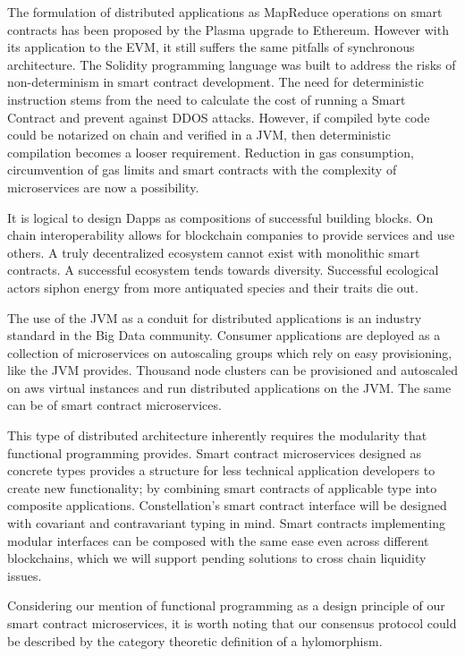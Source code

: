 \documentclass{article}
\begin{document}
The formulation of distributed applications as MapReduce operations on smart contracts has been proposed by the Plasma upgrade to Ethereum. However with its application to the EVM, it still suffers the same pitfalls of synchronous architecture. The Solidity programming language was built to address the risks of non-determinism in smart contract development. The need for deterministic instruction stems from the need to calculate the cost of running a Smart Contract and prevent against DDOS attacks. However, if compiled byte code could be notarized on chain and verified in a JVM, then deterministic compilation becomes a looser requirement. Reduction in gas consumption, circumvention of gas limits and smart contracts with the complexity of microservices are now a possibility.

It is logical to design Dapps as compositions of successful building blocks. On chain interoperability allows for blockchain companies to provide services and use others. A truly decentralized ecosystem cannot exist with monolithic smart contracts. A successful ecosystem tends towards diversity. Successful ecological actors siphon energy from more antiquated species and their traits die out. 

The use of the JVM as a conduit for distributed applications is an industry standard in the Big Data community. Consumer applications are deployed as a collection of microservices on autoscaling groups which rely on easy provisioning, like the JVM provides. Thousand node clusters can be provisioned and autoscaled on aws virtual instances and run distributed applications on the JVM. The same can be of smart contract microservices. 

This type of distributed architecture inherently requires the modularity that functional programming provides. Smart contract microservices designed as concrete types provides a structure for less technical application developers to create new functionality; by combining smart contracts of applicable type into composite applications. Constellation's smart contract interface will be designed with covariant and contravariant typing in mind. Smart contracts implementing modular interfaces can be composed with the same ease even across different blockchains, which we will support pending solutions to cross chain liquidity issues.

Considering our mention of functional programming as a design principle of our smart contract microservices, it is worth noting that our consensus protocol could be described by the category theoretic definition of a hylomorphism.
\end{document}

